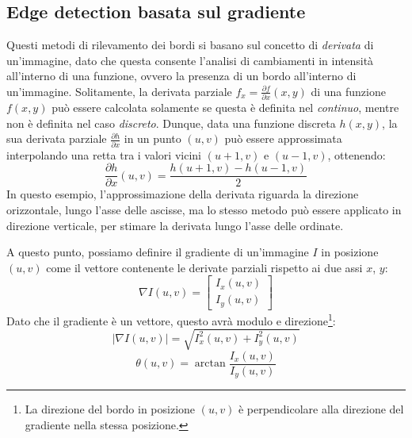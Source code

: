 \subsection{Edge detection basata sul gradiente}
\label{subsec:gradient-based-edge-detection}
Questi metodi di rilevamento dei bordi si basano sul concetto di \textit{derivata} di un'immagine, dato che questa consente l'analisi di cambiamenti in intensit\`a all'interno di una funzione, ovvero la presenza di un bordo all'interno di un'immagine. Solitamente, la derivata parziale $f_{x}=\frac{\partial f}{\partial x}(x, y)$ di una funzione $f(x, y)$ pu\`o essere calcolata solamente se questa \`e  definita nel \textit{continuo}, mentre non \`e definita nel caso \textit{discreto}. Dunque, data una funzione discreta $h(x, y)$, la sua derivata parziale $\frac{\partial h}{\partial x}$ in un punto $(u, v)$ pu\`o essere approssimata interpolando una retta tra i valori vicini $(u + 1, v)$ e $(u - 1, v)$, ottenendo:
\begin{equation}
	\frac{\partial h}{\partial x}(u, v) = \frac{h(u + 1, v) - h(u - 1, v)}{2}
	\label{eq:image-derivative}
\end{equation}
In questo esempio, l'approssimazione della derivata riguarda la direzione orizzontale, lungo l'asse delle ascisse, ma lo stesso metodo pu\`o essere applicato in direzione verticale, per stimare la derivata lungo l'asse delle ordinate.\par
A questo punto, possiamo definire il gradiente di un'immagine $I$ in posizione $(u, v)$ come il vettore contenente le derivate parziali rispetto ai due assi $x$, $y$:
\begin{equation}
	\nabla I(u, v) = 
		\begin{bmatrix}
			I_{x}(u, v) \\ I_{y}(u, v)
		\end{bmatrix}
	\label{eq:image-gradient}
\end{equation}
Dato che il gradiente \`e un vettore, questo avr\`a modulo e direzione\footnote{La direzione del bordo in posizione $(u, v)$ \`e perpendicolare alla direzione del gradiente nella stessa posizione.}:
\begin{equation}
	|\nabla I(u, v)| = \sqrt{I_{x}^{2}(u, v)+I_{y}^{2}(u, v)}
	\label{eq:image-gradient-magnitude}
\end{equation}
\begin{equation}
	\theta (u, v) = \arctan{\frac{I_{x}(u, v)}{I_{y}(u, v)}}
	\label{eq:image-gradient-direction}
\end{equation}\par
